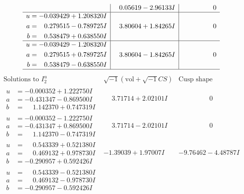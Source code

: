 \documentclass[1p]{elsarticle_modified}
\theoremstyle{definition}
\newcommand{\I}{\sqrt{-1}}
\begin{document}
$$\begin{array}{c|c|c}
 & \phantom{-}0.05619 - 2.96133 I & \phantom{-0.000000 } 0 \\ \hline\begin{aligned}
u &= -0.039429 + 1.208320 I \\
a &= \phantom{-}0.279515 - 0.789725 I \\
b &= \phantom{-}0.538479 + 0.638550 I\end{aligned}
 & \phantom{-}3.80604 + 1.84265 I & \phantom{-0.000000 } 0 \\ \hline\begin{aligned}
u &= -0.039429 - 1.208320 I \\
a &= \phantom{-}0.279515 + 0.789725 I \\
b &= \phantom{-}0.538479 - 0.638550 I\end{aligned}
 & \phantom{-}3.80604 - 1.84265 I & \phantom{-0.000000 } 0\\
 \hline 
 \end{array}$$\newpage$$\begin{array}{c|c|c}  
\text{Solutions to }I^u_{2}& \I (\text{vol} + \sqrt{-1}CS) & \text{Cusp shape}\\
 \hline 
\begin{aligned}
u &= -0.000352 + 1.222750 I \\
a &= -0.431347 - 0.869500 I \\
b &= \phantom{-}1.142370 + 0.747319 I\end{aligned}
 & \phantom{-}3.71714 + 2.02101 I & \phantom{-0.000000 } 0 \\ \hline\begin{aligned}
u &= -0.000352 - 1.222750 I \\
a &= -0.431347 + 0.869500 I \\
b &= \phantom{-}1.142370 - 0.747319 I\end{aligned}
 & \phantom{-}3.71714 - 2.02101 I & \phantom{-0.000000 } 0 \\ \hline\begin{aligned}
u &= \phantom{-}0.543339 + 0.521380 I \\
a &= \phantom{-}0.469132 + 0.978730 I \\
b &= -0.290957 + 0.592426 I\end{aligned}
 & -1.39039 + 1.97007 I & -9.76462 - 4.48787 I \\ \hline\begin{aligned}
u &= \phantom{-}0.543339 - 0.521380 I \\
a &= \phantom{-}0.469132 - 0.978730 I \\
b &= -0.290957 - 0.592426 I\end{aligned}

\end{array}$$
\end{document}
